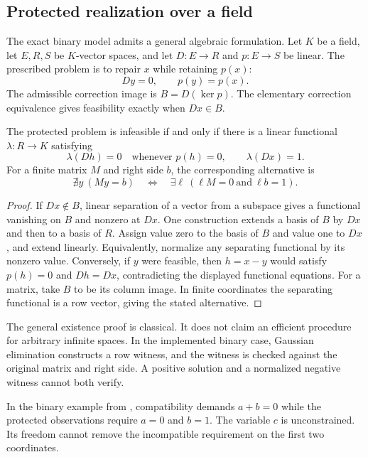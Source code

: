 \subsection{Protected realization over a field}

The exact binary model admits a general algebraic formulation. Let $K$ be a field, let $E,R,S$ be $K$-vector spaces, and let $D:E\to R$ and $p:E\to S$ be linear. The prescribed problem is to repair $x$ while retaining $p(x)$:
\[
Dy=0,\qquad p(y)=p(x).
\]
The admissible correction image is $B=D(\ker p)$. The elementary correction equivalence gives feasibility exactly when $Dx\in B$.

\begin{PPTtheorem}
\label{PPT:res:24:5}
\label{PPT:thm:linear-alternative}
The protected problem is infeasible if and only if there is a linear functional $\lambda:R\to K$ satisfying
\[
\lambda(Dh)=0\quad\text{whenever }p(h)=0,
\qquad \lambda(Dx)=1.
\]
For a finite matrix $M$ and right side $b$, the corresponding alternative is
\[
\nexists y\ (My=b)
\quad\Longleftrightarrow\quad
\exists\ell\ (\ell M=0\ \text{and}\ \ell b=1).
\]
\end{PPTtheorem}
\begin{proof}
If $Dx\notin B$, linear separation of a vector from a subspace gives a functional vanishing on $B$ and nonzero at $Dx$. One construction extends a basis of $B$ by $Dx$ and then to a basis of $R$. Assign value zero to the basis of $B$ and value one to $Dx$, and extend linearly. Equivalently, normalize any separating functional by its nonzero value. Conversely, if $y$ were feasible, then $h=x-y$ would satisfy $p(h)=0$ and $Dh=Dx$, contradicting the displayed functional equations. For a matrix, take $B$ to be its column image. In finite coordinates the separating functional is a row vector, giving the stated alternative.
\end{proof}

The general existence proof is classical. It does not claim an efficient procedure for arbitrary infinite spaces. In the implemented binary case, Gaussian elimination constructs a row witness, and the witness is checked against the original matrix and right side. A positive solution and a normalized negative witness cannot both verify.


In the binary example from , compatibility demands $a+b=0$ while the protected observations require $a=0$ and $b=1$. The variable $c$ is unconstrained. Its freedom cannot remove the incompatible requirement on the first two coordinates.

